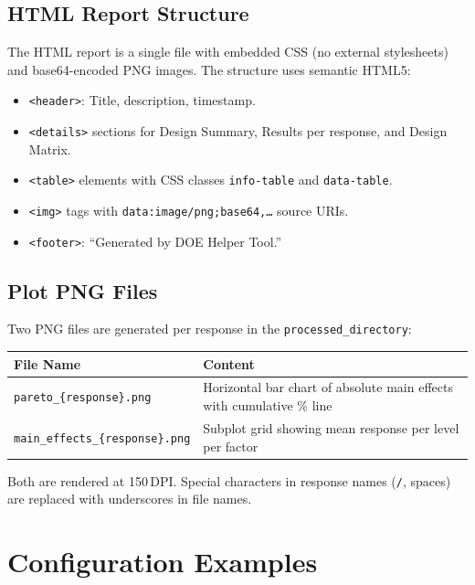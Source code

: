 \documentclass[11pt]{book}
\begin{document}
\section{HTML Report Structure}

The HTML report is a single file with embedded CSS (no external stylesheets) and base64-encoded PNG images. The structure uses semantic HTML5:

\begin{itemize}[nosep]
  \item \texttt{<header>}: Title, description, timestamp.
  \item \texttt{<details>} sections for Design Summary, Results per response, and Design Matrix.
  \item \texttt{<table>} elements with CSS classes \texttt{info-table} and \texttt{data-table}.
  \item \texttt{<img>} tags with \texttt{data:image/png;base64,\ldots} source URIs.
  \item \texttt{<footer>}: ``Generated by DOE Helper Tool.''
\end{itemize}

\section{Plot PNG Files}

Two PNG files are generated per response in the \texttt{processed\_directory}:

\begin{table}[H]
\centering
\begin{tabular}{@{}ll@{}}
\toprule
\textbf{File Name} & \textbf{Content} \\
\midrule
\texttt{pareto\_\{response\}.png} & Horizontal bar chart of absolute main effects with cumulative \% line \\
\texttt{main\_effects\_\{response\}.png} & Subplot grid showing mean response per level per factor \\
\bottomrule
\end{tabular}
\end{table}

Both are rendered at 150\,DPI. Special characters in response names (\texttt{/}, spaces) are replaced with underscores in file names.


\chapter{Configuration Examples}
\label{app:examples}
\end{document}
